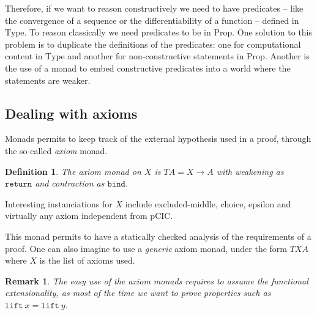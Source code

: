 \documentclass[a4paper,11pt]{article}
\newcommand{\N}{\mathbb{N}}
\newcommand{\Type}{\mbox{Type}}
\newcommand{\Prop}{\mbox{Prop}}
\newtheorem{definition}{Definition}
\newtheorem{remark}{Remark}
\theoremstyle{definition}
\theoremstyle{remark}
\begin{document}
Therefore, if we want to reason constructively we need to have predicates -- like the convergence of a sequence or the differentiability of a function -- defined in $\Type$. To reason classically we need predicates to be in $\Prop$. One solution to this problem is to duplicate the definitions of the predicates: one for computational content in $\Type$ and another for non-constructive statements in $\Prop$. Another is the use of a monad to embed constructive predicates into a world where the statements are weaker.





\subsection{Dealing with axioms}

Monads permits to keep track of the external hypothesis used in a proof, through the so-called \emph{axiom} monad.

\begin{definition}
  The axiom monad on $X$ is $T A = X \rightarrow A$ with weakening as $\mathtt{return}$ and contraction as $\mathtt{bind}$.
\end{definition}

Interesting instanciations for $X$ include excluded-middle, choice, epsilon and virtually any axiom independent from pCIC.

This monad permits to have a statically checked analysis of the requirements of a proof. One can also imagine to use a \emph{generic} axiom monad, under the form $T X A$ where $X$ is the list of axioms used.

\begin{remark}
  The easy use of the axiom monads requires to assume the functional extensionality, as most of the time we want to prove properties such as $\mathtt{lift}\ x = \mathtt{lift}\ y$.
\end{remark} %
\end{document}
